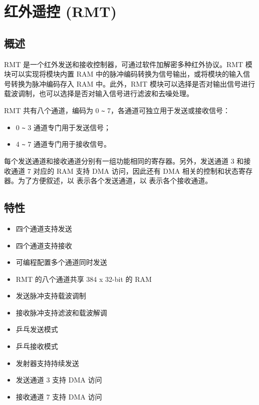 \documentclass[main\_\_CN.tex]{subfiles}
\begin{document}

\ifglobal
\else
    {\let\clearpage\relax \listoftodos}
    \tableofcontents
\fi



\hypertarget{rmt}{}
\chapter{红外遥控 (RMT)}
\label{mod:rmt}


\section{概述}
RMT 是一个红外发送和接收控制器，可通过软件加解密多种红外协议。RMT 模块可以实现将模块内置 RAM 中的脉冲编码转换为信号输出，或将模块的输入信号转换为脉冲编码存入 RAM 中。此外，RMT 模块可以选择是否对输出信号进行载波调制，也可以选择是否对输入信号进行滤波和去噪处理。

RMT 共有八个通道，编码为 0 \verb+~+ 7，各通道可独立用于发送或接收信号：
\begin{itemize}
    \item 0 \verb+~+ 3 通道专门用于发送信号；
    \item 4 \verb+~+ 7 通道专门用于接收信号。
\end{itemize}

每个发送通道和接收通道分别有一组功能相同的寄存器。另外，发送通道 3 和接收通道 7 对应的 RAM 支持 DMA 访问，因此还有 DMA 相关的控制和状态寄存器。为了方便叙述，以  表示各个发送通道，以  表示各个接收通道。

\section{特性}
\begin{itemize}
\item 四个通道支持发送
\item 四个通道支持接收
\item 可编程配置多个通道同时发送
\item RMT 的八个通道共享 384 x 32-bit 的 RAM
\item 发送脉冲支持载波调制
\item 接收脉冲支持滤波和载波解调
\item 乒乓发送模式
\item 乒乓接收模式
\item 发射器支持持续发送
\item 发送通道 3 支持 DMA 访问
\item 接收通道 7 支持 DMA 访问
\end{itemize}
\end{document}
